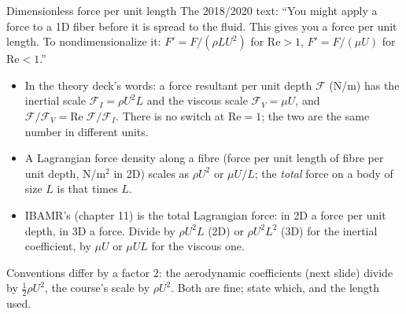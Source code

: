 \documentclass[aspectratio=169,11pt]{beamer}
\begin{document}
\begin{frame}{Dimensionless force per unit length}
\label{fr:force}
\small The 2018/2020 text: ``You might apply a force to a 1D fiber before it is spread to the fluid. This gives you a force per unit length. To nondimensionalize it:
$F' = F/(\rho L U^2)$ for $\mathrm{Re} > 1$, $F' = F/(\mu U)$ for $\mathrm{Re} < 1$.''
\begin{itemize}
  \item In the theory deck's words: a force resultant per unit depth $\mathcal{F}$ (N/m) has the inertial scale $\mathcal{F}_I = \rho U^2 L$ and the viscous scale $\mathcal{F}_V = \mu U$, and $\mathcal{F}/\mathcal{F}_V = \mathrm{Re}\;\mathcal{F}/\mathcal{F}_I$. There is no switch at $\mathrm{Re} = 1$; the two are the same number in different units.
  \item A Lagrangian force density along a fibre (force per unit length of fibre per unit depth, N/m$^2$ in 2D) scales as $\rho U^2$ or $\mu U/L$; the \emph{total} force on a body of size $L$ is that times $L$.
  \item IBAMR's  (chapter 11) is the total Lagrangian force: in 2D a force per unit depth, in 3D a force. Divide by $\rho U^2 L$ (2D) or $\rho U^2 L^2$ (3D) for the inertial coefficient, by $\mu U$ or $\mu U L$ for the viscous one.
\end{itemize}
\vspace{1mm}
\begin{punchbox}
\small Conventions differ by a factor $2$: the aerodynamic coefficients (next slide) divide by $\frac12\rho U^2$, the course's scale by $\rho U^2$. Both are fine; state which, and the length used.
\end{punchbox}
\end{frame}
\end{document}
